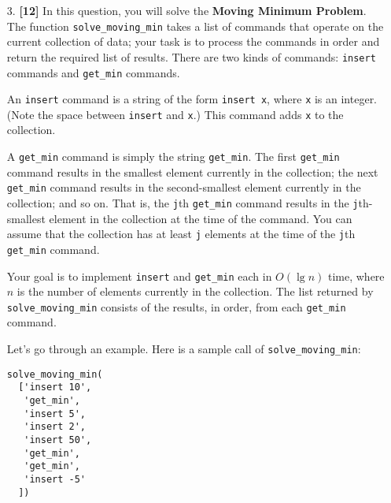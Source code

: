 \documentclass{assignment-263}
\begin{document}
\program

\begin{enumerate}
\item[3.] \textbf{[12]} 
In this question, you will solve the {\bf Moving Minimum Problem}. The function \verb|solve_moving_min| takes a list of commands that operate on the current collection of data; your task is to process the commands in order and return the required list of results. There are two kinds of commands: \verb|insert| commands and \verb|get_min| commands.

An \verb|insert| command is a string of the form \verb|insert x|, where \verb|x| is an integer. (Note the space between \verb|insert| and \verb|x|.) This command adds \verb|x| to the collection.

A \verb|get_min| command is simply the string \verb|get_min|. The first \verb|get_min| command results in the smallest element currently in the collection; the next \verb|get_min| command results in the second-smallest element currently in the collection; and so on. That is, the \verb|j|th \verb|get_min| command results in the \verb|j|th-smallest element in the collection at the time of the command. You can assume that the collection has at least \verb|j| elements at the time of the \verb|j|th \verb|get_min| command.

Your goal is to implement \verb|insert| and \verb|get_min| each in $O(\lg n)$ time, where $n$ is the number of elements currently in the collection. The list returned by \verb|solve_moving_min| consists of the results, in order, from each \verb|get_min| command.

Let's go through an example. Here is a sample call of \verb|solve_moving_min|:

\begin{verbatim}
solve_moving_min(
  ['insert 10',
   'get_min',
   'insert 5',
   'insert 2',
   'insert 50',
   'get_min',
   'get_min',
   'insert -5'
  ])
\end{verbatim}


\end{enumerate}
\end{document}
